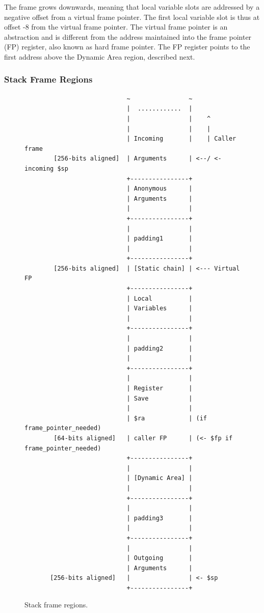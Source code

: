 The frame grows downwards, meaning that local variable slots are addressed by a
negative offset from a virtual frame pointer. The first local variable slot is
thus at offset -8 from the virtual frame pointer.  The virtual frame pointer is
an abstraction and is different from the address maintained into the frame
pointer (FP) register, also known as hard frame pointer.  The FP register points
to the first address above the Dynamic Area region, described next.

\subsubsection{Stack Frame Regions}
\label{sss:stack-frame-region}

\begin{figure}
{\small
\begin{verbatim}
                            ~                ~
                            |  ............  |
                            |                |    ^
                            |                |    |
                            | Incoming       |    | Caller frame
        [256-bits aligned]  | Arguments      | <--/ <- incoming $sp
                            +----------------+
                            | Anonymous      |
                            | Arguments      |
                            |                |
                            +----------------+
                            |                |
                            | padding1       |
                            |                |
                            +----------------+
        [256-bits aligned]  | [Static chain] | <--- Virtual FP
                            +----------------+
                            | Local          |
                            | Variables      |
                            |                |
                            +----------------+
                            |                |
                            | padding2       |
                            |                |
                            +----------------+
                            |                |
                            | Register       |
                            | Save           |
                            |                |
                            | $ra            | (if frame_pointer_needed)
        [64-bits aligned]   | caller FP      | (<- $fp if frame_pointer_needed)
                            +----------------+
                            |                |
                            | [Dynamic Area] |
                            |                |
                            +----------------+
                            |                |
                            | padding3       |
                            |                |
                            +----------------+
                            |                |
                            | Outgoing       |
                            | Arguments      |
       [256-bits aligned]   |                | <- $sp
                            +----------------+
\end{verbatim}
}
\caption{Stack frame regions.} \label{fig:stack-frame}
\end{figure}

